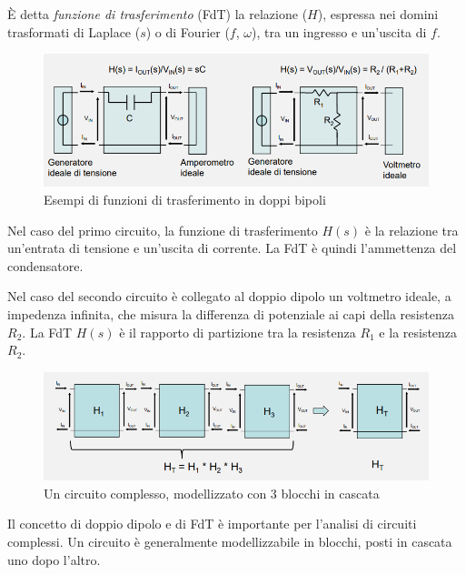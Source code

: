 \documentclass{article}
\begin{document}
È detta \textit{funzione di trasferimento} (FdT) la relazione ($H$), espressa nei domini trasformati di Laplace ($s$) o di Fourier ($f$, $\omega$), tra un ingresso e un’uscita di $f$.

\begin{figure}[h]
  \centering
  \includegraphics[scale=0.7]{IM_funzioni_trasferimento}
  \caption{Esempi di funzioni di trasferimento in doppi bipoli}
  \label{Schema_funzioni_trasferimento}
\end{figure}

Nel caso del primo circuito, la funzione di trasferimento $H(s)$ è la relazione tra un'entrata di tensione e un'uscita di corrente. La FdT è quindi l'ammettenza del condensatore.

\vspace{1mm}

Nel caso del secondo circuito è collegato al doppio dipolo un voltmetro ideale, a impedenza infinita, che misura la differenza di potenziale ai capi della resistenza $R_2$. La FdT $H(s)$ è il rapporto di partizione tra la resistenza $R_1$ e la resistenza $R_2$.

\begin{figure}[h]
  \centering
  \includegraphics[scale=0.7]{IM_circuito_complesso}
  \caption{Un circuito complesso, modellizzato con 3 blocchi in cascata}
  \label{Schema_circuito_complesso}
\end{figure}

Il concetto di doppio dipolo e di FdT è importante per l'analisi di circuiti complessi. Un circuito è generalmente modellizzabile in blocchi, posti in cascata uno dopo l'altro. 
\end{document}
